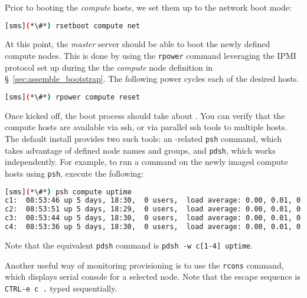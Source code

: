 Prior to booting the {\em compute} hosts, we set them up to the network boot
mode:

\begin{lstlisting}[language=bash,keywords={},upquote=true]
[sms](*\#*) rsetboot compute net
\end{lstlisting} 

At this point, the {\em master} server should be able to boot the newly defined
compute nodes. This is done by using the \texttt{rpower} \xCAT{} command
leveraging the IPMI protocol set up during the the {\em compute} node definition
in \S~\ref{sec:assemble_bootstrap}. The following power cycles each of the
desired hosts.


\begin{lstlisting}[language=bash,keywords={},upquote=true]
[sms](*\#*) rpower compute reset
\end{lstlisting} 

Once kicked off, the boot process should take about .  You can verify that
the compute hosts are available via ssh, or via parallel ssh tools to multiple
hosts.  The default install provides two such tools: an \xCAT{}-related
\texttt{psh} command, which takes advantage of defined node names and groups,
and \texttt{pdsh}, which works independently.  For example, to run a command on
the newly imaged compute hosts using \texttt{psh}, execute the following:

\begin{lstlisting}[language=bash]
[sms](*\#*) psh compute uptime
c1:  08:53:46 up 5 days, 18:30,  0 users,  load average: 0.00, 0.01, 0.05
c2:  08:53:51 up 5 days, 18:29,  0 users,  load average: 0.00, 0.01, 0.05
c3:  08:53:44 up 5 days, 18:30,  0 users,  load average: 0.00, 0.01, 0.05
c4:  08:53:36 up 5 days, 18:30,  0 users,  load average: 0.00, 0.01, 0.05
\end{lstlisting}
Note that the equivalent \texttt{pdsh} command is \texttt{pdsh -w c[1-4] uptime}. 


Another  useful way of monitoring provisioning is to use  the \texttt{rcons} command,
which displays serial console for a selected node. Note that the escape sequence
is \texttt{CTRL-e c .} typed sequentially. 
